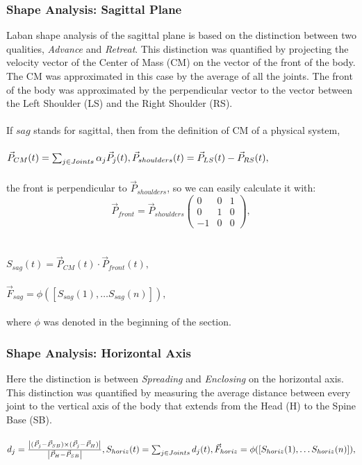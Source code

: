 \documentclass[journal]{journal}
\begin{document}
\subsubsection{Shape Analysis: Sagittal Plane}
Laban shape analysis of the sagittal plane is based on the distinction
between two qualities, \textit{Advance} and \textit{Retreat}. This distinction was quantified by projecting the 
velocity vector of the Center of Mass (CM) on the vector of the front of the
body.
The CM was approximated in this case by the average of all the joints. 
The front of the body was approximated by the perpendicular vector to the vector 
between the Left Shoulder (LS) and
the Right Shoulder (RS).
\\\\If $sag$ stands for sagittal, then from the definition of CM of a physical
system,
\\
\\$\vec{P}_{CM}(t) = \sum_{j \in Joints} \alpha_{j}\vec{P}_{j}(t),
\\
\\\vec{P}_{shoulders}(t)=\vec{P}_{LS}(t)-\vec{P}_{RS}(t),$
\\\\the front is perpendicular to $\vec{P}_{shoulders}$, so we can easily calculate it with:
\\\[\vec{P}_{front}=\vec{P}_{shoulders}\left( \begin{array}{ccc}
0 & 0 & 1 \\
0 & 1 & 0 \\
-1 & 0 & 0 \end{array} \right),\]
\\\\$S_{sag}(t) = \vec{P}_{CM}(t)\cdot\vec{P}_{front}(t),$ 
\\\\$\vec{F}_{sag} = \phi([S_{sag}(1), \ldots S_{sag}(n)]),$
\\\\where $\phi$ was denoted in the beginning of the section.
\subsubsection{Shape Analysis: Horizontal Axis}
Here the distinction is between \textit{Spreading} and \textit{Enclosing} on the horizontal axis.
This distinction was quantified by measuring the average distance between every joint to 
the vertical axis of the body that extends from the Head (H) to the Spine Base (SB).
\\
\\$d_{j} = \frac{\left|(\vec{P}_{j}-\vec{P}_{SB})\times
(\vec{P}_{j}-\vec{P}_{H})\right|}{\left|\vec{P}_{H}-\vec{P}_{SB}\right|},
\\
\\S_{horiz}(t) = \sum_{j \in Joints} d_{j}(t),
\\
\\\vec{F}_{horiz} = \phi([S_{horiz}(1), \ldots S_{horiz}(n)]),$
\end{document}
